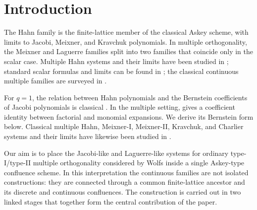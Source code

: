 \documentclass[10pt]{amsart}
\theoremstyle{plain}
\theoremstyle{definition}
\theoremstyle{remark}
\begin{document}
\maketitle
\enlargethispage{4pt}
\tableofcontents

\section{Introduction}
\label{sec:intro}

The Hahn family is the finite-lattice member of the classical Askey
scheme, with limits to Jacobi, Meixner, and Kravchuk polynomials. In
multiple orthogonality, the Meixner and Laguerre families split into two
families that coincide only in the scalar case. Multiple Hahn systems and
their limits have been studied in
\cite{ArvesuCoussementVanAssche2003,BranquinhoDiazFoulquieManas2023Hahn,
BranquinhoDiazFoulquieManasWolfs2025,BranquinhoDiazFoulquieManas2025Classical};
standard scalar formulas and limits can be found in
\cite{KoekoekLeskySwarttouw2010}; the classical continuous multiple
families are surveyed in \cite{VanAsscheCoussement2001}.

For \(q=1\), the relation between Hahn polynomials and the Bernstein
coefficients of Jacobi polynomials is classical
\cite{Ciesielski1987,Waldron2006}.  In the multiple setting,
\cite[Proposition~3.18]{BranquinhoDiazFoulquieManasWolfs2025} gives a coefficient
identity between factorial and monomial expansions. We derive its
Bernstein form below. Classical multiple Hahn, Meixner-I, Meixner-II,
Kravchuk, and Charlier systems and their limits have likewise been studied in
\cite{ArvesuCoussementVanAssche2003,
BranquinhoDiazFoulquieManasWolfs2024Discrete}.

Our aim is to place the Jacobi-like and Laguerre-like systems for ordinary
type-I/type-II multiple orthogonality considered by Wolfs
\cite{Wolfs2024} inside a single Askey-type confluence scheme. In this
interpretation the continuous
families are not isolated constructions: they are connected through a
common finite-lattice ancestor and its discrete and continuous
confluences. The construction is carried out in two linked stages that
together form the central contribution of the paper.
\end{document}
